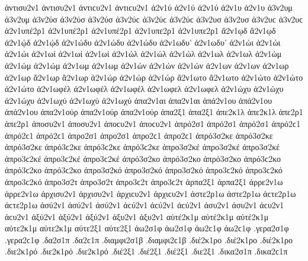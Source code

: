 {ἀντισυ2ν1 ἀντισυ2ν1 ἀντιϲυ2ν1 ἀντιϲυ2ν1 
ἀ2ν1ύ ἀ2ν1ύ ἀ2ν1ύ   %
ἀ2ν1υ ἀ2ν1υ 
ἀ3ν2υμ ἀ3ν2υμ   %
ἀ3ν2ύσ ἀ3ν2ύσ ἀ3ν2ύσ ἀ3ν2ύϲ ἀ3ν2ύϲ ἀ3ν2ύϲ   %
ἀ3ν2υσ ἀ3ν2υσ ἀ3ν2υϲ ἀ3ν2υϲ   %
ἀ2ν1υπέ2ρ1 ἀ2ν1υπέ2ρ1 ἀ2ν1υπέ2ρ1   %
ἀ2ν1υπε2ρ1 ἀ2ν1υπε2ρ1 
ἄ2ν1ῳδ ἄ2ν1ῳδ   %
ἀ2ν1ῴδ ἀ2ν1ῴδ 
ἀ2ν1ώδυ ἀ2ν1ώδυ ἀ2ν1ώδυ   %
ἀ2ν1ωδυ' ἀ2ν1ωδυ' 
ἀ2ν1ώι ἀ2ν1ώι ἀ2ν1ώι   %
ἀ2ν1ωί ἀ2ν1ωί ἀ2ν1ωί 
ἀ2ν1ώλ ἀ2ν1ώλ ἀ2ν1ώλ   %
ἀ2ν1ωλ ἀ2ν1ωλ 
ἀ2ν1ώμ ἀ2ν1ώμ ἀ2ν1ώμ   %
ἀ2ν1ωμ ἀ2ν1ωμ 
ἀ2ν1ών ἀ2ν1ών ἀ2ν1ών   %
ἀ2ν1ων ἀ2ν1ων 
ἀ2ν1ωρ ἀ2ν1ωρ   %
ἄ2ν1ωρ ἄ2ν1ωρ   %
ἀ2ν1ώρ ἀ2ν1ώρ ἀ2ν1ώρ 
ἄ2ν1ωτο ἄ2ν1ωτο   %
ἀ2ν1ώτο ἀ2ν1ώτο ἀ2ν1ώτο 
ἀ2ν1ωφέλ ἀ2ν1ωφέλ ἀ2ν1ωφέλ   %
ἀ2ν1ωφελ ἀ2ν1ωφελ   %
ἀ2ν1ώχυ ἀ2ν1ώχυ ἀ2ν1ώχυ   %
ἀ2ν1ωχύ ἀ2ν1ωχύ ἀ2ν1ωχύ 
ἀπα2ν1αι ἀπα2ν1αι   %
ἀπά2ν1ου ἀπά2ν1ου ἀπά2ν1ου   %
ἀπα2ν1ούρ ἀπα2ν1ούρ ἀπα2ν1ούρ 
ἁπα2ξ1 ἁπα2ξ1   %
ἀπε2κ1λ ἀπε2κ1λ   %
ἁπε2ρ1 ἁπε2ρ1   %
ἀποσυ2ν1 ἀποσυ2ν1 ἀποϲυ2ν1 ἀποϲυ2ν1   %
ἀπρό2σ1 ἀπρό2σ1 ἀπρό2σ1 ἀπρό2ϲ1 ἀπρό2ϲ1 ἀπρό2ϲ1   %
ἀπρο2σ1 ἀπρο2σ1 ἀπρο2ϲ1 ἀπρο2ϲ1 
ἀπρό3σ2κε ἀπρό3σ2κε ἀπρό3σ2κε ἀπρό3ϲ2κε ἀπρό3ϲ2κε ἀπρό3ϲ2κε   %
ἀπρο3σ2κέ ἀπρο3σ2κέ ἀπρο3σ2κέ ἀπρο3ϲ2κέ ἀπρο3ϲ2κέ ἀπρο3ϲ2κέ 
ἀπρό3σ2κο ἀπρό3σ2κο ἀπρό3σ2κο ἀπρό3ϲ2κο ἀπρό3ϲ2κο ἀπρό3ϲ2κο   %
ἀπρο3σ2κό ἀπρο3σ2κό ἀπρο3σ2κό ἀπρο3ϲ2κό ἀπρο3ϲ2κό ἀπρο3ϲ2κό 
ἀπρο3σ2τ ἀπρο3σ2τ ἀπρο3ϲ2τ ἀπρο3ϲ2τ   %
ἁρπα2ξ1 ἁρπα2ξ1   %
ἀρρε2ν1ω ἀρρε2ν1ω   %
ἀρχισυ2ν1 ἀρχισυ2ν1 ἀρχιϲυ2ν1 ἀρχιϲυ2ν1   %
ἀστε2ρ1ω ἀστε2ρ1ω ἀϲτε2ρ1ω ἀϲτε2ρ1ω   %
ἀσύ2ν1 ἀσύ2ν1 ἀσύ2ν1 ἀϲύ2ν1 ἀϲύ2ν1 ἀϲύ2ν1   %
ἀσυ2ν1 ἀσυ2ν1 ἀϲυ2ν1 ἀϲυ2ν1 
ἀξύ2ν1 ἀξύ2ν1 ἀξύ2ν1   %
ἀξυ2ν1 ἀξυ2ν1 
αὐτέ2κ1μ αὐτέ2κ1μ αὐτέ2κ1μ   %
αὐτε2κ1μ αὐτε2κ1μ 
αὐτε2ξ1 αὐτε2ξ1   %
ἀω2σ1φ ἀω2σ1φ ἀω2ϲ1φ ἀω2ϲ1φ   %
.γερα2σ1φ .γερα2ϲ1φ   %
.δα2σ1π .δα2ϲ1π   %
.διαμφι2σ1β .διαμφι2ϲ1β   %
.διέ2κ1ρο .διέ2κ1ρο .διέ2κ1ρο   %
.διε2κ1ρό .διε2κ1ρό .διε2κ1ρό 
.διέ2ξ1 .διέ2ξ1 .διέ2ξ1   %
.διε2ξ1   %
.δικα2σ1π .δικα2ϲ1π   %
}
